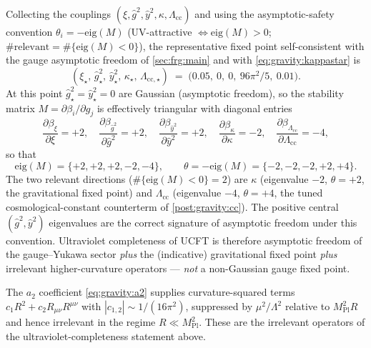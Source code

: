 Collecting the couplings $(\xi,\hat g^{2},\hat y^{2},\kappa,\Lambda_{\mathrm{cc}})$
and using the asymptotic-safety convention $\theta_{i}=-\mathrm{eig}(M)$
(UV-attractive $\iff \mathrm{eig}(M)>0$; $\#\text{relevant}=\#\{\mathrm{eig}(M)<0\}$),
the representative fixed point self-consistent with the gauge asymptotic
freedom of \autoref{sec:frg:main} and with \eqref{eq:gravity:kappastar} is
\begin{equation}\label{eq:gravity:FP}
  (\xi_{\star},\,\hat g^{2}_{\star},\,\hat y^{2}_{\star},\,\kappa_{\star},\,\Lambda_{\mathrm{cc},\star})
  \;=\;
  \bigl(0.05,\ 0,\ 0,\ 96\pi^{2}/5,\ 0.01\bigr).
\end{equation}
At this point $\hat g^{2}_{\star}=\hat y^{2}_{\star}=0$ are Gaussian
(asymptotic freedom), so the stability matrix $M=\partial\beta_{i}/\partial g_{j}$
is effectively triangular with diagonal entries
\begin{equation}\label{eq:gravity:stab}
  \frac{\partial\beta_{\xi}}{\partial\xi}=+2,\quad
  \frac{\partial\beta_{\hat g^{2}}}{\partial\hat g^{2}}=+2,\quad
  \frac{\partial\beta_{\hat y^{2}}}{\partial\hat y^{2}}=+2,\quad
  \frac{\partial\beta_{\kappa}}{\partial\kappa}=-2,\quad
  \frac{\partial\beta_{\Lambda_{\mathrm{cc}}}}{\partial\Lambda_{\mathrm{cc}}}=-4,
\end{equation}
so that
\begin{equation}\label{eq:gravity:eig}
  \mathrm{eig}(M)=\{+2,+2,+2,-2,-4\},
  \qquad
  \theta=-\mathrm{eig}(M)=\{-2,-2,-2,+2,+4\}.
\end{equation}
The two relevant directions ($\#\{\mathrm{eig}(M)<0\}=2$) are $\kappa$
(eigenvalue $-2$, $\theta=+2$, the gravitational fixed point) and
$\Lambda_{\mathrm{cc}}$ (eigenvalue $-4$, $\theta=+4$, the tuned
cosmological-constant counterterm of \autoref{post:gravity:cc}). The
positive central $(\hat g^{2},\hat y^{2})$ eigenvalues are the correct
signature of asymptotic freedom under this convention. Ultraviolet
completeness of UCFT is therefore asymptotic freedom of the gauge--Yukawa
sector \emph{plus} the (indicative) gravitational fixed point \emph{plus}
irrelevant higher-curvature operators --- \emph{not} a non-Gaussian gauge
fixed point.

\begin{remark}
\label{rmk:gravity:higher}
The $a_{2}$ coefficient \eqref{eq:gravity:a2} supplies curvature-squared
terms $c_{1}R^{2}+c_{2}R_{\mu\nu}R^{\mu\nu}$ with
$|c_{1,2}|\sim 1/(16\pi^{2})$, suppressed by $\mu^{2}/\Lambda^{2}$ relative
to $M_{\mathrm{Pl}}^{2}R$ and hence irrelevant in the regime
$R\ll M_{\mathrm{Pl}}^{2}$. These are the irrelevant operators of the
ultraviolet-completeness statement above.
\end{remark}
